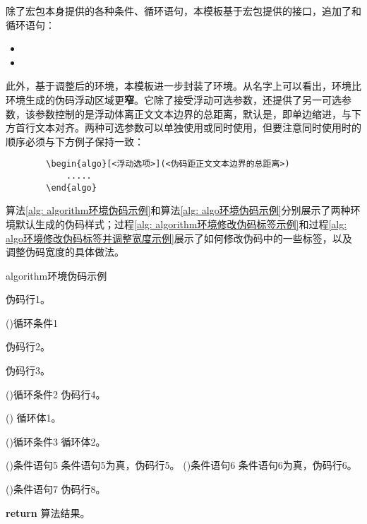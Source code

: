\documentclass[print, doctor, vlined]{DissertUESTC}
\begin{document}
	除了\href{https://mirrors.sustech.edu.cn/CTAN/macros/latex/contrib/algorithm2e/doc/algorithm2e.pdf}{}宏包本身提供的各种条件、循环语句，本模板基于宏包提供的接口，追加了和循环语句：
	\begin{itemize}
		\item {}
		\item {}
	\end{itemize}
	
	
	此外，基于调整后的环境，本模板进一步封装了环境。从名字上可以看出，环境比环境生成的伪码浮动区域更\textbf{窄}。它除了接受浮动可选参数\shad{[htbp]}，还提供了另一可选参数，该参数控制的是浮动体离正文文本边界的总距离，默认是\shad{4em}，即单边缩进\shad{2em}，与下方首行文本对齐。两种可选参数可以单独使用或同时使用，但要注意同时使用时的顺序必须与下方例子保持一致：
	
	\begin{verbatim}
		\begin{algo}[<浮动选项>](<伪码距正文文本边界的总距离>)
		    .....
		\end{algo}
	\end{verbatim}
	
	算法\ref{alg: algorithm环境伪码示例}和算法\ref{alg: algo环境伪码示例}分别展示了两种环境默认生成的伪码样式；过程\ref{alg: algorithm环境修改伪码标签示例}和过程\ref{alg: algo环境修改伪码标签并调整宽度示例}展示了如何修改伪码中的一些标签，以及调整伪码宽度的具体做法。

	
	\begin{algorithm}[!h]
		\caption{algorithm环境伪码示例} \label{alg: algorithm环境伪码示例}
		伪码行1。
		
		\For(){循环条件1}{
			伪码行2。
			
			伪码行3。
			
			\DoWhile(){循环条件2}{
				伪码行4。
			}
			
			\Loop(){
				循环体1。
			}
			
			\Repeat(){循环条件3}{
				循环体2。
			}
			
			\uIf(){条件语句5}{
				条件语句5为真，伪码行5。
			}
			\uElseIf(){条件语句6}{
				条件语句6为真，伪码行6。
			}
			
			\If(){条件语句7}{
				伪码行8。
			}
		}
		\textbf{return} 算法结果。
	\end{algorithm}
	
\end{document}
